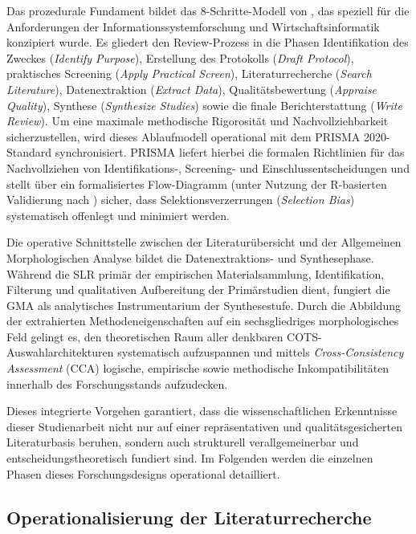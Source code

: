Das prozedurale Fundament bildet das 8-Schritte-Modell von \cite{2NHFUF5N}, das speziell für die Anforderungen der Informationssystemforschung und Wirtschaftsinformatik konzipiert wurde. Es gliedert den Review-Prozess in die Phasen Identifikation des Zweckes (\textit{Identify Purpose}), Erstellung des Protokolls (\textit{Draft Protocol}), praktisches Screening (\textit{Apply Practical Screen}), Literaturrecherche (\textit{Search Literature}), Datenextraktion (\textit{Extract Data}), Qualitätsbewertung (\textit{Appraise Quality}), Synthese (\textit{Synthesize Studies}) sowie die finale Berichterstattung (\textit{Write Review}). Um eine maximale methodische Rigorosität und Nachvollziehbarkeit sicherzustellen, wird dieses Ablaufmodell operational mit dem PRISMA 2020-Standard \cite{BP42WGEK} synchronisiert. PRISMA liefert hierbei die formalen Richtlinien für das Nachvollziehen von Identifikations-, Screening- und Einschlussentscheidungen und stellt über ein formalisiertes Flow-Diagramm (unter Nutzung der R-basierten Validierung nach \cite{MQ9M8Q7L}) sicher, dass Selektionsverzerrungen (\textit{Selection Bias}) systematisch offenlegt und minimiert werden.

Die operative Schnittstelle zwischen der Literaturübersicht und der Allgemeinen Morphologischen Analyse bildet die Datenextraktions- und Synthesephase. Während die SLR primär der empirischen Materialsammlung, Identifikation, Filterung und qualitativen Aufbereitung der Primärstudien dient, fungiert die GMA als analytisches Instrumentarium der Synthesestufe. Durch die Abbildung der extrahierten Methodeneigenschaften auf ein sechsgliedriges morphologisches Feld gelingt es, den theoretischen Raum aller denkbaren COTS-Auswahlarchitekturen systematisch aufzuspannen und mittels \textit{Cross-Consistency Assessment} (CCA) logische, empirische sowie methodische Inkompatibilitäten innerhalb des Forschungsstands aufzudecken.

Dieses integrierte Vorgehen garantiert, dass die wissenschaftlichen Erkenntnisse dieser Studienarbeit nicht nur auf einer repräsentativen und qualitätsgesicherten Literaturbasis beruhen, sondern auch strukturell verallgemeinerbar und entscheidungstheoretisch fundiert sind. Im Folgenden werden die einzelnen Phasen dieses Forschungsdesigns operational detailliert.

\subsection{Operationalisierung der Literaturrecherche}
\label{subsec:operationalisierung_recherche}

